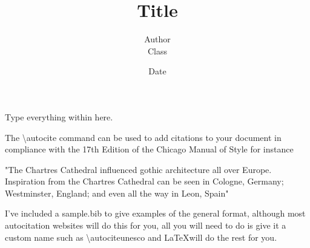 \documentclass[letterpaper,12pt]{article}
\begin{document}
\title{\vspace{2in}\normalsize Title\vspace{2in}}
\author{\normalsize Author \\[-0.3in] \normalsize Class}
\date{\vspace{-0.25in}\normalsize Date}
\maketitle
{}
\newpage

Type everything within here. 

The \textbackslash autocite{} command can be used to add citations to your document in compliance with the 17th Edition of the Chicago Manual of Style for instance 

"The Chartres Cathedral influenced gothic architecture all over Europe.
Inspiration from the Chartres Cathedral can be seen in Cologne, Germany; Westminster, England; and even all the way in Leon, Spain\autocite{simson}"

I've included a sample.bib to give examples of the general format, although most autocitation websites will do this for you, all you will need to do is give it a custom name such as \textbackslash autocite{unesco} and \LaTeX will do the rest for you.


\newpage
\printbibliography
\end{document}
